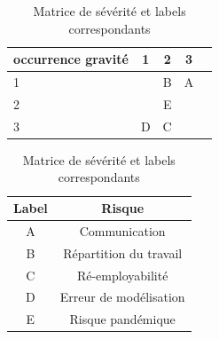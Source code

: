 \begin{table}[H]
	\centering
	\begin{tabular}{|p{2cm}|c|c|c|c|}
		\hline
		occurrence \newline gravité &1	& 2 & 3 \\ \hline
		1	&  \cellcolor{green} & B \cellcolor{green} & A \cellcolor{orange} \\ \hline
		2	& \cellcolor{green}	& E \cellcolor{orange}	& \cellcolor{red} \\ \hline
		3	& D \cellcolor{orange}	& C	\cellcolor{red}& \cellcolor{red}\\ \hline
	\end{tabular}
	\hspace{2cm}
	\begin{tabular}{|c|c|}
		\hline
		Label & Risque \\ \hline
		A	\cellcolor{orange} &	Communication \\ \hline
		B	\cellcolor{green} &	Répartition du travail \\ \hline
		C	\cellcolor{red} &	Ré-employabilité \\ \hline
		D	\cellcolor{orange} &	Erreur de modélisation \\ \hline
		E	\cellcolor{orange} &	Risque pandémique \\ \hline
	\end{tabular}
	\caption{Matrice de sévérité et labels correspondants}
\end{table}
